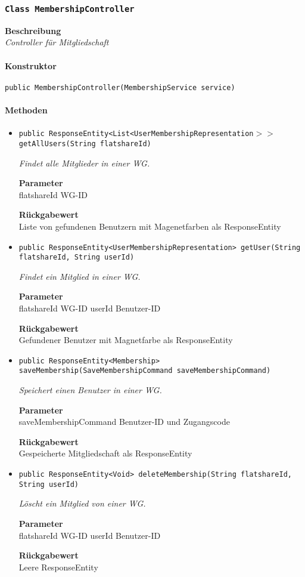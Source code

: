     \subsubsection{\texttt{Class MembershipController}}
    \textbf{Beschreibung} \\
    \textit{Controller für Mitgliedschaft}
    \paragraph*{Konstruktor}
    \texttt{public MembershipController(MembershipService service)}
    \paragraph*{Methoden}
    \begin{itemize}
    	\item{\texttt{public ResponseEntity<List<UserMembershipRepresentation$>>$ getAllUsers(String flatshareId)}}
    	
    	\textit{Findet alle Mitglieder in einer WG.}
    	
    	\textbf{Parameter} \\
    	flatshareId WG-ID
    	
    	\textbf{Rückgabewert} \\
    	Liste von gefundenen Benutzern mit Magenetfarben als ResponseEntity        \item{\texttt{public ResponseEntity<UserMembershipRepresentation> getUser(String flatshareId, String userId)}}
    	
    	\textit{Findet ein Mitglied in einer WG.}
    	
    	\textbf{Parameter} \\
    	flatshareId WG-ID
    	userId Benutzer-ID
    	
    	\textbf{Rückgabewert} \\
    	Gefundener Benutzer mit Magnetfarbe als ResponseEntity        \item{\texttt{public ResponseEntity<Membership> saveMembership(SaveMembershipCommand saveMembershipCommand)}}
    	
    	\textit{Speichert einen Benutzer in einer WG.}
    	
    	\textbf{Parameter} \\
    	saveMembershipCommand Benutzer-ID und Zugangscode
    	
    	\textbf{Rückgabewert} \\
    	Gespeicherte Mitgliedschaft als ResponseEntity        \item{\texttt{public ResponseEntity<Void> deleteMembership(String flatshareId, String userId)}}
    	
    	\textit{Löscht ein Mitglied von einer WG.}
    	
    	\textbf{Parameter} \\
    	flatshareId WG-ID
    	userId Benutzer-ID
    	
    	\textbf{Rückgabewert} \\
    	Leere ResponseEntity
    \end{itemize}
